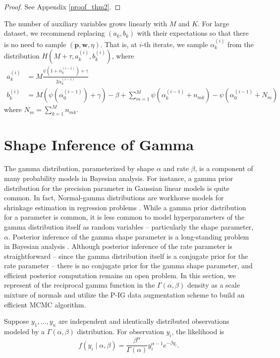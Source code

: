 \documentclass{statsoc}
\newcommand{\p}{\bm{p}}
\newcommand{\w}{\bm{w}}
\begin{document}
\begin{proof}
See Appendix \ref{proof_thm2}.
\end{proof}

The number of auxiliary variables grows linearly with $M$ and $K$. For large dataset, we recommend replacing $(a_k, b_k)$ with their expectations so that there is no need to sample $(\p, \w, \eta)$. That is, at $i$-th iterate, we sample $\alpha_k^{(i)}$ from the distribution $H(M+\tau, a_k^{(i)}, b_k^{(i)})$, where 
\begin{align*}
a_k^{(i)} &= M \frac{\psi(1 + \alpha_k^{(i-1)}) + \gamma}{2\alpha_k^{(i-1)}} \\
b_k^{(i)} &= M( \psi(\alpha_0^{(i-1)}) +\gamma)- \beta + \sum_{m=1}^M \psi(\alpha_k^{(i-1)} + n_{mk}) - \psi(\alpha_0^{(i-1)} + N_{m})
\end{align*}
where $N_{m} = \sum_{k=1}^M n_{mk}$.



\section{Shape Inference of Gamma}
\label{sec:Shape_Inference}
The gamma distribution, parameterized by shape $\alpha$ and rate $\beta$, is a component of many probability models in Bayesian analysis.  For instance, a gamma prior distribution for the precision parameter in Gaussian linear models is quite common.  In fact, Normal-gamma distributions are workhorse models for shrinkage estimation in regression problems \citep{griffin2010}.  While a gamma prior distribution for a parameter is common, it is less common to model hyperparameters of the gamma distribution itself as random variables -- particularly the shape parameter, $\alpha$.  Posterior inference of the gamma shape parameter is a long-standing problem in Bayesian analysis \citep{damsleth1975conjugate, damien1995approximate, rossell2009gaga, miller2018fast}.  Although posterior inference of the rate parameter is straightforward -- since the gamma distribution itself is a conjugate prior for the rate parameter -- there is no conjugate prior for the gamma shape parameter, and efficient posterior computation remains an open problem. In this section, we represent of the reciprocal gamma function in the $\Gamma(\alpha,\beta)$ density as a scale mixture of normals and utilize the P-IG data augmentation scheme to build an efficient MCMC algorithm.  


Suppose $y_1, \ldots, y_n$ are independent and identically distributed observations modeled by a $\Gamma(\alpha,\beta)$ distribution.  For observation $y_i$, the likelihood is 
\begin{equation}
f\left(y_i \mid \alpha, \beta\right) = \frac{\beta^\alpha}{\Gamma\left(\alpha\right)} y_i^{\alpha - 1} e^{-\beta y_i}.
\end{equation}
 
\end{document}
